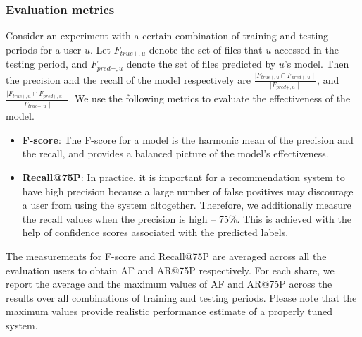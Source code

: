 
\subsubsection{Evaluation metrics}
\label{sec:metrics}
Consider an experiment with a certain combination of training and
testing periods for a user $u$.  Let $F_{true +, u}$ denote the set of
files that $u$ accessed in the testing period, and $F_{pred +, u}$
denote the set of files predicted by $u$'s model.  Then the precision
and the recall of the model respectively are $\frac{\mid F_{true +, u}
  \cap F_{pred +, u} \mid}{\mid F_{pred +, u}\mid }$, and $\frac{\mid F_{true +,
    u} \cap F_{pred +, u} \mid}{\mid F_{true +, u}\mid}$.  We use the following
metrics to evaluate the effectiveness of the model.
\begin{itemize}
  \renewcommand{\labelitemi}{$\bullet$}
\item \textbf{F-score}: The F-score for a model is the harmonic mean
  of the precision and the recall, and provides a balanced picture of
  the model's effectiveness.
\item \textbf{Recall@75P}: In practice, it is important for a
  recommendation system to have high precision because a large number
  of false positives may discourage a user from using the system
  altogether.  Therefore, we additionally measure the recall values
  when the precision is high -- 75\%.  This is achieved with the help
  of confidence scores associated with the predicted labels.
\end{itemize} 
The measurements for F-score and Recall@75P are averaged across all
the evaluation users to obtain AF and AR@75P respectively. For each
share, we report the average and the maximum values of AF and AR@75P
across the results over all combinations of training and testing
periods.  Please note that the maximum values provide realistic
performance estimate of a properly tuned system.

